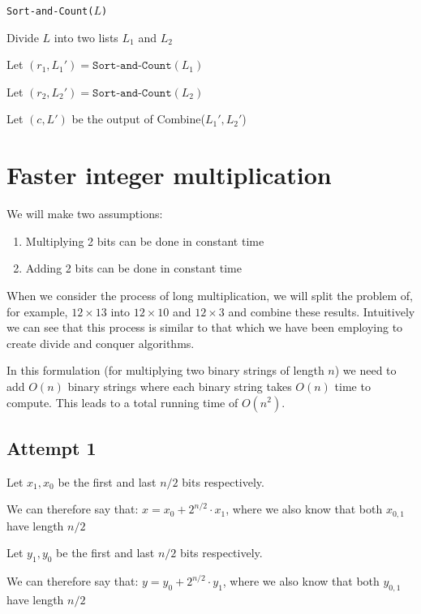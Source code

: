 \documentclass{article}
\begin{document}
\begin{algorithm}
  \caption{\texttt{Sort-and-Count($L$)}}

  Divide $L$ into two lists $L_{1}$ and $L_{2}$

  Let $(r_{1},L_{1}') = \texttt{Sort-and-Count}(L_{1}) $

  Let $(r_{2},L_{2}') = \texttt{Sort-and-Count}(L_{2}) $

  Let $(c, L')$ be the output of Combine($L_{1}',L_{2}'$)


\end{algorithm}


\section{Faster integer multiplication}

We will make two assumptions:

\begin{enumerate}
  \item Multiplying 2 bits can be done in constant time
  \item Adding 2 bits can be done in constant time
\end{enumerate}

When we consider the process of long multiplication, we will split the problem of, for example, $12 \times 13$ into $12 \times 10$ and $12 \times 3$ and combine these results. Intuitively we can see that this process is similar to that which we have been employing to create divide and conquer algorithms.

In this formulation (for multiplying two binary strings of length $n$) we need to add $O(n)$ binary strings where each binary string takes $O(n)$ time to compute. This leads to a total running time of $O(n^{2})$.

\subsection{Attempt 1}

Let $x_{1},x_{0}$ be the first and last $n/2$ bits respectively.

We can therefore say that: $x = x_{0} + 2^{n/2}\cdot x_{1}$, where we also know that both $x_{0,1}$ have length $n/2$

Let $y_{1},y_{0}$ be the first and last $n/2$ bits respectively.

We can therefore say that: $y = y_{0} + 2^{n/2}\cdot y_{1}$, where we also know that both $y_{0,1}$ have length $n/2$
\end{document}
